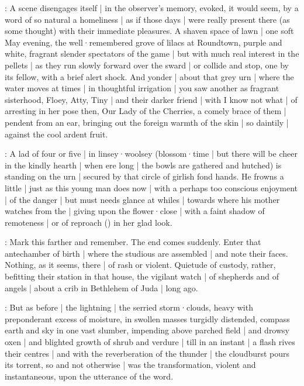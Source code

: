\begin{omitted}

:
A scene disengages itself |
in the observer's memory,
evoked,
it would seem,
by a word of so natural a homeliness |
as if those days |
were really present there
(as some thought)
with their immediate pleasures.
A shaven space of lawn |
one soft May evening,
the well·remembered grove of lilacs at Roundtown,
purple and white,
fragrant slender spectators of the game |
but with much real interest in the pellets |
as they run slowly forward over the sward |
or collide and stop,
one by its fellow,
with a brief alert shock.
And yonder |
about that grey urn |
where the water moves at times |
in thoughtful irrigation |
you saw another as fragrant sisterhood,
Floey,
Atty,
Tiny |
and their darker friend |
with I know not what |
of arresting in her pose then,
Our Lady of the Cherries,
a comely brace of them |
pendent from an ear,
bringing out the foreign warmth of the skin |
so daintily |
against the cool ardent fruit.

:
A lad of four or five |
in linsey·woolsey
(blossom·time |
but there will be cheer in the kindly hearth |
when ere long |
the bowls are gathered and hutched)
is standing on the urn |
secured by that circle of girlish fond hands.
He frowns a little |
just as this young man does now |
with a perhaps too conscious enjoyment |
of the danger |
but must needs glance at whiles |
towards where his mother watches from the  |
giving upon the flower·close |
with a faint shadow of remoteness |
or of reproach
()
in her glad look.
\end{omitted}


:
Mark this farther and remember.
The end comes suddenly.
Enter that ante\-chamber of birth |
where the studious are assembled |
and note their faces.
Nothing,
as it seems,
there |
of rash or violent.
Quietude of custody,
rather,
befitting their station in that house,
the vigilant watch |
of shepherds and of angels |
about a crib in Bethlehem of Juda |
long ago.

:
But as before |
the lightning |
the serried storm·clouds,
heavy with preponderant excess of moisture,
in swollen masses turgidly distended,
compass earth and sky in one vast slumber,
impending above parched field |
and drowsy oxen |
and blighted growth of shrub and verdure |
till in an instant |
a flash rives their centres |
and with the reverberation of the thunder |
the cloudburst pours its torrent,
so and not otherwise |
was the transformation,
violent and instantaneous,
upon the utterance of the word.

